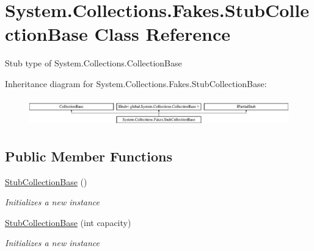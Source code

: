 \hypertarget{class_system_1_1_collections_1_1_fakes_1_1_stub_collection_base}{\section{System.\-Collections.\-Fakes.\-Stub\-Collection\-Base Class Reference}
\label{class_system_1_1_collections_1_1_fakes_1_1_stub_collection_base}
}


Stub type of System.\-Collections.\-Collection\-Base 


Inheritance diagram for System.\-Collections.\-Fakes.\-Stub\-Collection\-Base\-:\begin{figure}[H]
\begin{center}
\leavevmode
\includegraphics[height=1.228070cm]{class_system_1_1_collections_1_1_fakes_1_1_stub_collection_base}
\end{center}
\end{figure}
\subsection*{Public Member Functions}
\begin{DoxyCompactItemize}
\item 
\hyperlink{class_system_1_1_collections_1_1_fakes_1_1_stub_collection_base_ae9c1b6e2272da51a682a1371fc1799ec}{Stub\-Collection\-Base} ()
\begin{DoxyCompactList}\small\item\em Initializes a new instance\end{DoxyCompactList}\item 
\hyperlink{class_system_1_1_collections_1_1_fakes_1_1_stub_collection_base_a4965f74af7d9398d24bd4e968b9c74c9}{Stub\-Collection\-Base} (int capacity)
\begin{DoxyCompactList}\small\item\em Initializes a new instance\end{DoxyCompactList}\end{DoxyCompactItemize}
